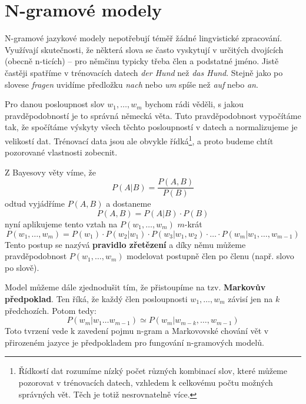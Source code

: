 \documentclass[12pt,a4paper]{report}
\begin{document}
\section{N-gramové modely}
N-gramové jazykové modely nepotřebují téměř žádné lingvistické zpracování. Využívají skutečnosti, že některá slova se často vyskytují v určitých dvojících (obecně n-ticích) -- pro němčinu typicky třeba člen a podstatné jméno. Jistě častěji spatříme v trénovacích datech \textit{der Hund} než \textit{das Hund}. Stejně jako po slovese \textit{fragen} uvidíme předložku \textit{nach} nebo \textit{um} spíše než \textit{auf} nebo \textit{an}.

Pro danou posloupnost slov $w_{1},\ldots,w_{m}$ bychom rádi věděli, s jakou pravděpodobností je to správná německá věta. Tuto pravděpodobnost vypočítáme tak, že spočítáme výskyty všech těchto posloupností v datech a normalizujeme je velikostí dat. Trénovací data jsou ale obvykle řídká\footnote{Řídkostí dat rozumíme nízký počet různých kombinací slov, které můžeme pozorovat v trénovacích datech, vzhledem k celkovému počtu možných správných vět. Těch je totiž nesrovnatelně více.}, a proto budeme chtít pozorované vlastnosti zobecnit.

Z Bayesovy věty víme, že
\begin{equation}
P(A|B) = \frac{P(A,B)}{P(B)}
\end{equation}
odtud vyjádříme $P(A,B)$ a dostaneme
\begin{equation}
P(A,B) = P(A|B) \cdot P(B)
\end{equation}
nyní aplikujeme tento vztah na $P(w_{1},\ldots,w_{m})$ $m$-krát
\begin{equation}
P(w_{1},\ldots,w_{m}) = P(w_{1}) \cdot P(w_{2}|w_{1}) \cdot P(w_{3}|w_{1},w_{2}) \cdot \ldots \cdot P(w_{m}|w_{1},\ldots,w_{m-1})
\end{equation}
Tento postup se nazývá \textbf{pravidlo zřetězení} a díky němu můžeme pravděpodobnost $P(w_{1},\ldots,w_{m})$ modelovat postupně člen po členu (např. slovo po slově).

Model můžeme dále zjednodušit tím, že přistoupíme na tzv. \textbf{Markovův předpoklad}. Ten říká, že každý člen posloupnosti $w_{1},\ldots,w_{m}$ závisí jen na $k$ předchozích. Potom tedy:
\begin{equation}\label{eq:markov}
P(w_{m}|w_{1} \ldots w_{m-1}) \simeq P(w_{m}|w_{m-k}, \ldots, w_{m-1})
\end{equation}
Toto tvrzení vede k zavedení pojmu n-gram a Markovovské chování vět v přirozeném jazyce je předpokladem pro fungování n-gramových modelů.
\end{document}
